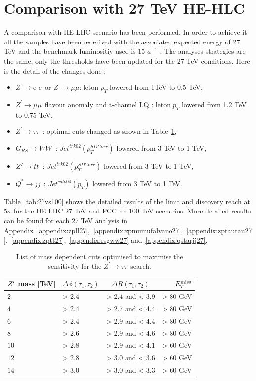 \documentclass{cernrep}
\newcommand*{\Zptata}{\ensuremath{Z^{\prime}\rightarrow \tau\tau}}
\newcommand*{\Zpee}{\ensuremath{Z^{\prime}\rightarrow \text{e e}}}
\newcommand*{\Zpmumu}{\ensuremath{Z^{\prime}\rightarrow \mu\mu}}
\newcommand*{\met}{\ensuremath{E_{T}^{\rm{miss}}}}
\newcommand*{\zptt}{\ensuremath{Z^{\prime} \rightarrow \ttbar}}
\newcommand*{\qjj}{\ensuremath{Q^{*} \rightarrow jj}}
\newcommand*{\rsg}{\ensuremath{G_{RS} \rightarrow WW}}
\begin{document}
\section{Comparison with 27 TeV HE-HLC}
\label{sec:ana27tev}
A comparison with HE-LHC scenario has been performed.
In order to achieve it all the samples have been rederived with the associated expected energy of 27 TeV and the benchmark luminositiy used is 15 $a^{-1}$ .
\newline
The analyses strategies are the same, only the thresholds have been updated for the 27 TeV conditions. Here is the detail of the changes done :
\begin{itemize}
\item \Zpee\ or \Zpmumu : leton $p_T$ lowered from 1TeV to 0.5 TeV,
\item \Zpmumu\ flavour anomaly and t-channel LQ : leton $p_T$ lowered from  1.2 TeV to 0.75 TeV,
\item \Zptata\ : optimal cuts changed as shown in Table~\ref{tab:leptonicresonances:selectiontautau27},
\item \rsg\ : $Jet^{trk02}(p_T^{SD Corr})$ lowered from 3 TeV to 1 TeV,
\item \zptt\ : $Jet^{trk02}(p_T^{SD Corr})$ lowered from 3 TeV to 1 TeV,
\item \qjj\ : $Jet^{calo04}(p_T)$ lowered from 3 TeV to 1 TeV.
\end{itemize}

Table~\ref{tab:27vs100} shows the detailed results of the limit and discovery reach at $5\sigma$ for the HE-LHC 27 TeV and FCC-hh 100 TeV scenarios. More detailed results can be found for each 27 TeV analysis in Appendix~\ref{appendix:zpll27},~\ref{appendix:zpmumufalvano27},~\ref{appendix:zptautau27},~\ref{appendix:zptt27},~\ref{appendix:rsgww27}  and~\ref{appendix:qstarjj27}.

\begin{table}[htbp]
   \centering
\begin{tabular}{|l|l|c|r|}
  \hline
  \hline
   $Z^{\prime}$ mass [TeV] &  $\Delta \phi(\tau_1, \tau_2)$&  $\Delta R(\tau_1, \tau_2)$ & $\met$\\
  \hline
   $2$ & > 2.4 & > 2.4 and < 3.9 & > 80 GeV\\
   $4$ & > 2.4 & > 2.7 and < 4.4 & > 80 GeV\\
   $6$ & > 2.4 & > 2.9 and < 4.4 & > 80 GeV\\
   $8$ & > 2.6 & > 2.9 and < 4.6 & > 80 GeV\\
  $10$ & > 2.8 & > 2.9 and < 4.1 & > 60 GeV\\
  $12$ & > 2.8 & > 3.0 and < 3.6 & > 60 GeV\\
  $14$ & > 3.0 & > 3.0 and < 3.3 & > 60 GeV\\
  \hline
  \hline
  \end{tabular}
  \caption{List of mass dependent cuts optimised to maximise the sensitivity for the \Zptata\ search.}
  \label{tab:leptonicresonances:selectiontautau27}
\end{table}
\end{document}
